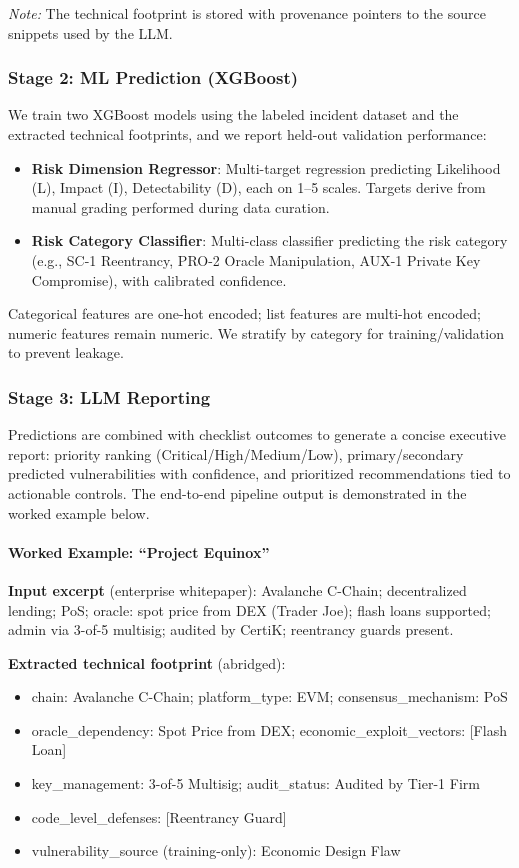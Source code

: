 \textit{Note:} The technical footprint is stored with provenance pointers to the source snippets used by the LLM.

\subsubsection{Stage 2: ML Prediction (XGBoost)}
We train two XGBoost models using the labeled incident dataset and the extracted technical footprints, and we report held-out validation performance:
\begin{itemize}
    \item \textbf{Risk Dimension Regressor}: Multi-target regression predicting Likelihood (L), Impact (I), Detectability (D), each on 1--5 scales. Targets derive from manual grading performed during data curation.
    \item \textbf{Risk Category Classifier}: Multi-class classifier predicting the risk category (e.g., SC-1 Reentrancy, PRO-2 Oracle Manipulation, AUX-1 Private Key Compromise), with calibrated confidence.
\end{itemize}
Categorical features are one-hot encoded; list features are multi-hot encoded; numeric features remain numeric. We stratify by category for training/validation to prevent leakage.

\subsubsection{Stage 3: LLM Reporting}
Predictions are combined with checklist outcomes to generate a concise executive report: priority ranking (Critical/High/Medium/Low), primary/secondary predicted vulnerabilities with confidence, and prioritized recommendations tied to actionable controls. The end-to-end pipeline output is demonstrated in the worked example below.

\paragraph{Worked Example: ``Project Equinox''}
\textbf{Input excerpt} (enterprise whitepaper): Avalanche C-Chain; decentralized lending; PoS; oracle: spot price from DEX (Trader Joe); flash loans supported; admin via 3-of-5 multisig; audited by CertiK; reentrancy guards present.

\textbf{Extracted technical footprint} (abridged):
\begin{itemize}
    \item chain: Avalanche C-Chain; platform\_type: EVM; consensus\_mechanism: PoS
    \item oracle\_dependency: Spot Price from DEX; economic\_exploit\_vectors: [Flash Loan]
    \item key\_management: 3-of-5 Multisig; audit\_status: Audited by Tier-1 Firm
    \item code\_level\_defenses: [Reentrancy Guard]
    \item vulnerability\_source (training-only): Economic Design Flaw
\end{itemize}

